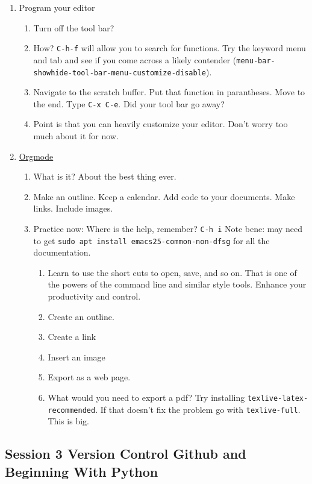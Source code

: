 \documentclass{article}
\begin{document}
\begin{enumerate}
\begin{enumerate}
\item Program your editor
\begin{enumerate}
\item Turn off the tool bar?
\item How? \texttt{C-h-f} will allow you to search for functions. Try the keyword menu and tab and see if you come across a likely contender (\texttt{menu-bar-showhide-tool-bar-menu-customize-disable}).
\item Navigate to the scratch buffer. Put that function in parantheses. Move to the end. Type \texttt{C-x C-e}. Did your tool bar go away?
\item Point is that you can heavily customize your editor. Don't worry too much about it for now.
\end{enumerate}
\item \href{org\#Top}{Orgmode}
\begin{enumerate}
\item What is it? About the best thing ever.
\item Make an outline. Keep a calendar. Add code to your documents. Make links. Include images.
\item Practice now:
Where is the help, remember? \texttt{C-h i}
Note bene: may need to get \texttt{sudo apt install emacs25-common-non-dfsg} for all the documentation. 
\begin{enumerate}
\item Learn to use the short cuts to open, save, and so on. That is one of the powers of the command line and similar style tools. Enhance your productivity and control.
\item Create an outline.
\item Create a link
\item Insert an image
\item Export as a web page.
\item What would you need to export a pdf?
Try installing \texttt{texlive-latex-recommended}. If that doesn't fix the problem go with \texttt{texlive-full}. This is big.
\end{enumerate}
\end{enumerate}
\end{enumerate}
\end{enumerate}
\subsection{Session 3 Version Control Github and Beginning With Python}
\label{sec:orgc7ac516}
\end{document}
